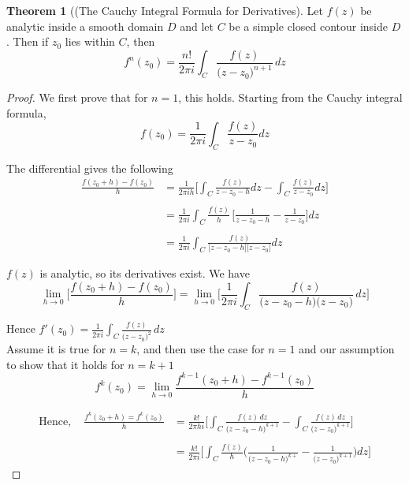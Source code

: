 \documentclass[11pt,a4paper]{article}
\theoremstyle{definition}
\newtheorem{thm}{Theorem}[section]
\begin{document}
\begin{thm}[(The Cauchy Integral Formula for Derivatives]
Let $f(z)$ be analytic inside a smooth domain $D$ and let $C$ be a simple closed contour inside $D$. Then if $z_0$ lies within $C$, then $$f^n(z_0) = \frac{n!}{2\pi i}\int_C \frac{f(z)}{\big(z - z_0\big)^{n+1}}\,dz$$
\end{thm}

\begin{proof}
We first prove that for $ n =1$, this holds. Starting from the Cauchy integral formula, $$f(z_0) = \frac{1}{2\pi i}\int_C\frac{f(z)}{z - z_0}dz$$

The differential gives the following
\begin{align*}
\frac{f(z_0 + h) - f(z_0)}{h} & = \frac{1}{2\pi i h}\Bigg[ \int_C \frac{f(z)}{z - z_0 - h}dz - \int_C \frac{f(z)}{z - z_0}dz\Bigg]\\\\
& = \frac{1}{2\pi i}\int_C \frac{f(z)}{h}\,\Bigg[\frac{1}{z - z_0 - h}- \frac{1}{z - z_0}\Bigg]dz\\\\
& = \frac{1}{2\pi i}\int_C \frac{f(z)}{\big[z - z_0 - h\big]\big[z-z_0\big]}dz
\end{align*}

$f(z)$ is analytic, so its derivatives exist. We have
$$\lim\limits_{h\rightarrow 0}\Bigg[\frac{f(z_0 + h) - f(z_0)}{h}\Bigg] = \lim\limits_{h\rightarrow 0}\Bigg[\frac{1}{2\pi i}\int_C \frac{f(z)}{\big(z - z_0 - h\big)\big(z - z_0\big)}\,dz\Bigg]$$

Hence $\displaystyle{f'(z_0) = \frac{1}{2\pi i}\int_C \frac{f(z)}{\big(z - z_0\big)^2}\,dz}$\\

Assume it is true for $n=k$, and then use the case for $n = 1$ and our assumption to show that it holds for $n=k + 1$ $$f^k(z_0) = \lim\limits_{h\rightarrow 0} \frac{f^{k-1}(z_0 + h) - f^{k-1}(z_0)}{h}$$

\begin{align*}
\text{Hence},\quad  \frac{f^k(z_0 + h) = f^k(z_0)}{h} & = \frac{k!}{2\pi hi}\Bigg[\int_C \frac{f(z)\,dz}{\big(z - z_0 - h\big)^{k+1}} - \int_C \frac{f(z)\,dz}{\big(z - z_0\big)^{k+1}}\Bigg]\\\\
& = \frac{k!}{2\pi i}\Bigg[\int_C\frac{f(z)}{h}\Bigg(\frac{1}{\big(z - z_0 -h\big)^{k+}} - \frac{1}{\big(z -z_0\big)^{k+1}}\Bigg)dz\Bigg]
\end{align*}


\end{proof}
\end{document}
